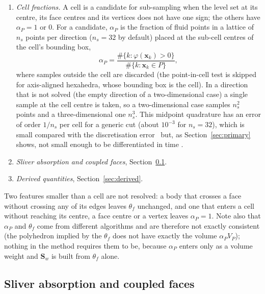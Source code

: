 \documentclass[11pt,a4paper]{article}
\theoremstyle{remark}
\newcommand{\xx}{\bm{x}}
\newcommand{\Sw}{\bm{S}_w}
\begin{document}
\begin{enumerate}
      rotating-wall source of Section~\ref{sec:ubpoint}%
      \ and the wall pieces of Section~\ref{sec:grad2}%
      .
\item \emph{Cell fractions.} A cell is a candidate for sub-sampling when the level set
      at its centre, its face centres and its vertices does not have one sign; the others
      have $\alpha_P=1$ or $0$. For a candidate, $\alpha_P$ is the fraction of fluid points
      in a lattice of $n_s$ points per direction ($n_s=32$ by default) placed at the
      sub-cell centres of the cell's bounding box,
      \begin{equation}
      \alpha_P=\frac{\#\{k:\varphi(\xx_k)>0\}}{\#\{k:\xx_k\in P\}},
      \label{eq:subsample}
      \end{equation}
      where samples outside the cell are discarded (the point-in-cell test is skipped for
      axis-aligned hexahedra, whose bounding box is the cell). In a direction that is not
      solved (the empty direction of a two-dimensional case) a single sample at the cell
      centre is taken, so a two-dimensional case samples $n_s^2$ points and a
      three-dimensional one $n_s^3$. This midpoint quadrature has an error of order
      $1/n_s$ per cell for a generic cut (about $10^{-3}$ for $n_s=32$), which is small
      compared with the discretisation error%
      \ but, as Section~\ref{sec:primary} shows, not small enough to be differentiated in time%
      .
\item \emph{Sliver absorption and coupled faces}, Section~\ref{sec:absorb}.
\item \emph{Derived quantities}, Section~\ref{sec:derived}.
\end{enumerate}
Two features smaller than a cell are not resolved: a body that crosses a face without
crossing any of its edges leaves $\theta_f$ unchanged, and one that enters a cell without
reaching its centre, a face centre or a vertex leaves $\alpha_P=1$. Note also that $\alpha_P$
and $\theta_f$ come from different algorithms and are therefore not exactly consistent (the
polyhedron implied by the $\theta_f$ does not have exactly the volume $\alpha_PV_P$); nothing
in the method requires them to be, because $\alpha_P$ enters only as a volume weight and
$\Sw$ is built from $\theta_f$ alone.

\subsection{Sliver absorption and coupled faces}
\label{sec:absorb}
\end{document}
